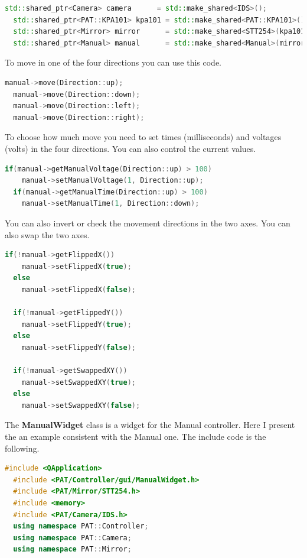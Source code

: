 \begin{lstlisting}[language=c++, gobble=2]
  std::shared_ptr<Camera> camera      = std::make_shared<IDS>();
  std::shared_ptr<PAT::KPA101> kpa101 = std::make_shared<PAT::KPA101>();
  std::shared_ptr<Mirror> mirror      = std::make_shared<STT254>(kpa101);
  std::shared_ptr<Manual> manual      = std::make_shared<Manual>(mirror, camera->getFrame()->getCentroid());
\end{lstlisting}


To move in one of the four directions you can use this code.

\begin{lstlisting}[language=c++, gobble=2]
  manual->move(Direction::up);
  manual->move(Direction::down);
  manual->move(Direction::left);
  manual->move(Direction::right);
\end{lstlisting}


To choose how much move you need to set times (milliseconds) and
voltages (volts) in the four directions. You can also control the
current values.

\begin{lstlisting}[language=c++, gobble=2]
  if(manual->getManualVoltage(Direction::up) > 100)
    manual->setManualVoltage(1, Direction::up);
  if(manual->getManualTime(Direction::up) > 100)
    manual->setManualTime(1, Direction::down);
\end{lstlisting}


You can also invert or check the movement directions in the two axes.
You can also swap the two axes.

\begin{lstlisting}[language=c++, gobble=2]
  if(!manual->getFlippedX())
    manual->setFlippedX(true);
  else
    manual->setFlippedX(false);
  
  if(!manual->getFlippedY())
    manual->setFlippedY(true);
  else
    manual->setFlippedY(false);
  
  if(!manual->getSwappedXY())
    manual->setSwappedXY(true);
  else
    manual->setSwappedXY(false);
\end{lstlisting}



The \textbf{ManualWidget} class is a widget for the Manual controller.
Here I present the an example consistent with the Manual one. The
include code is the following.

\begin{lstlisting}[language=c++, gobble=2]
  #include <QApplication>
  #include <PAT/Controller/gui/ManualWidget.h>
  #include <PAT/Mirror/STT254.h>
  #include <memory>
  #include <PAT/Camera/IDS.h>
  using namespace PAT::Controller;
  using namespace PAT::Camera;
  using namespace PAT::Mirror;
  
\end{lstlisting}


